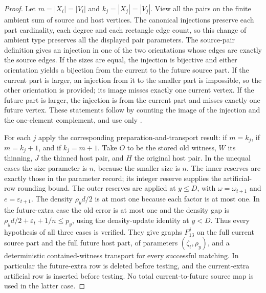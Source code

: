\begin{proof}
Let $m=|X_i|=|V_i|$ and $k_j=|X_j|=|V_j|$.
View all the pairs on the finite ambient sum of source and host vertices.
The canonical injections preserve each part cardinality, each degree
and each rectangle edge count, so this change of ambient type preserves
all the displayed pair parameters.
The source-pair definition gives an injection in one of the two
orientations whose edges are exactly the source edges. If the sizes are
equal, the injection is bijective and either orientation yields a
bijection from the current to the future source part. If the current
part is larger, an injection from it to the smaller part is impossible,
so the other orientation is provided; its image misses exactly one
current vertex. If the future part is larger, the injection is from
the current part and misses exactly one future vertex. These statements
follow by counting the image of the injection and the one-element
complement, and use only .

For each $j$ apply the corresponding preparation-and-transport result:
 if $m=k_j$,
 if $m=k_j+1$, and
 if $k_j=m+1$.
Take $O$ to be the stored old witness, $W$ its thinning, $J$ the
thinned host pair, and $H$ the original host pair. In the unequal
cases the size parameter is $n$, because the smaller size is $n$.
The inner reserves are exactly those in the parameter record; its
integer reserve supplies the artificial-row rounding bound. The outer
reserves are applied at $y\le D$, with
$\omega=\omega_{t+1}$ and $e=\varepsilon_{t+1}$.
The density $\rho_y d/2$ is at most one because each factor is at
most one. In the future-extra case the old error is at most one and
the density gap is
$\rho_y d/2+\varepsilon_t+1/n\le p_y$, using the density-update
identity at $y<D$. Thus every hypothesis of all three cases is verified.
They give graphs $F_{13}^j$ on the full current source part and the full
future host part, of parameters $(\zeta_t,\rho_y)$, and a deterministic
contained-witness transport for every successful matching. In particular
the future-extra row is deleted before testing, and the current-extra
artificial row is inserted before testing. No total current-to-future
source map is used in the latter case.


\end{proof}
